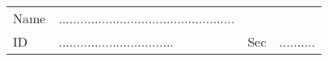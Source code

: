 \documentclass[amsfonts,bezier,leqno,fleqn,12pt,a4paper]{article}
\begin{document}
{{{\begin{large}
\newpage



\en
\end{large}

\newpage


\renewcommand{\thepage}{\noindent Math 101, Term 171, Exam II \hfill Answer Sheet  \hfill {\bf \fbox{003}}}

\begin{Large}


\begin{tabular}{llll}
Name & .................................................& & \\
ID &   ................................& Sec & ..........\\
\end{tabular}

\vspace{10mm}



\end{Large}}}}
\end{document}
